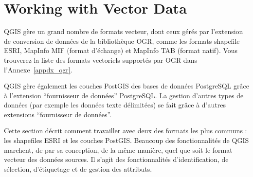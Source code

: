 
\section{Working with Vector Data}\label{label_workingvector}



QGIS g\`ere un grand nombre de formats vecteur, dont ceux g\'er\'es par l'extension de conversion de donn\'ees de la biblioth\`eque OGR, comme les formats shapefile ESRI, MapInfo MIF (format d'\'echange) et  MapInfo TAB (format natif).
Vous trouverez la liste des formats vectoriels support\'es par OGR dans l'Annexe~\ref{appdx_ogr}.

QGIS g\`ere \'egalement les couches PostGIS des bases de donn\'ees PostgreSQL gr\^ace \`a l'extension ``fournisseur de donn\'ees'' PostgreSQL. La gestion d'autres types de donn\'ees (par exemple les donn\'ees texte d\'elimit\'ees) se fait gr\^ace \`a d'autres extensions ``fournisseur de donn\'ees''.

Cette section d\'ecrit comment travailler avec deux des formats les plus communs : les shapefiles ESRI et les couches PostGIS. Beaucoup des fonctionnalit\'es de QGIS marchent, de par sa conception, de la m\^eme mani\`ere, quel que soit le format vecteur des donn\'ees sources. Il s'agit des fonctionnalit\'es d'identification, de s\'election, d'\'etiquetage et de gestion des attributs.

